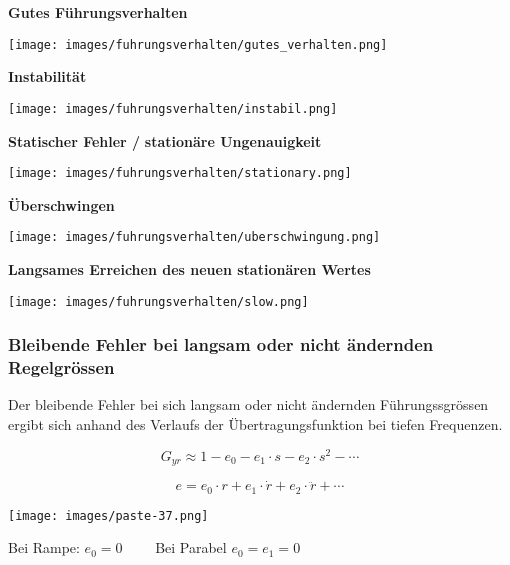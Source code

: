 \documentclass[
  10pt,
  a4paper,
  twocolumn]{article}
\numberwithin{equation}{section}
\begin{document}
\textbf{Gutes Führungsverhalten}

\texttt{[image: images/fuhrungsverhalten/gutes\_verhalten.png]}

\textbf{Instabilität}

\texttt{[image: images/fuhrungsverhalten/instabil.png]}

\textbf{Statischer Fehler /} \textbf{stationäre Ungenauigkeit}

\texttt{[image: images/fuhrungsverhalten/stationary.png]}

\textbf{Überschwingen}

\texttt{[image: images/fuhrungsverhalten/uberschwingung.png]}

\textbf{Langsames Erreichen des neuen stationären Wertes}

\texttt{[image: images/fuhrungsverhalten/slow.png]}

\subsubsection{Bleibende Fehler bei langsam oder nicht ändernden
Regelgrössen}\label{bleibende-fehler-bei-langsam-oder-nicht-uxe4ndernden-regelgruxf6ssen}

Der bleibende Fehler bei sich langsam oder nicht ändernden
Führungssgrössen ergibt sich anhand des Verlaufs der
Übertragungsfunktion bei tiefen Frequenzen.

\[
G_{yr}\approx 1-e_0-e_1\cdot s-e_2\cdot s^2 - \cdots
\]

\[
e = e_0 \cdot r + e_1 \cdot \dot{r}+e_2\cdot \ddot{r}+\cdots
\]

\texttt{[image: images/paste-37.png]}

\begin{tcolorbox}[enhanced jigsaw, coltitle=black, colback=white, breakable, colframe=quarto-callout-note-color-frame, rightrule=.15mm, left=2mm, opacityback=0, leftrule=.75mm, toptitle=1mm, colbacktitle=quarto-callout-note-color!10!white, bottomtitle=1mm, arc=.35mm, bottomrule=.15mm, title=\textcolor{quarto-callout-note-color}{\faInfo}\hspace{0.5em}{Stationärer Fehler}, titlerule=0mm, toprule=.15mm, opacitybacktitle=0.6]

Bei Rampe: \(e_0 = 0\qquad\) Bei Parabel \(e_0 = e_1 = 0\)

\end{tcolorbox}
\end{document}
